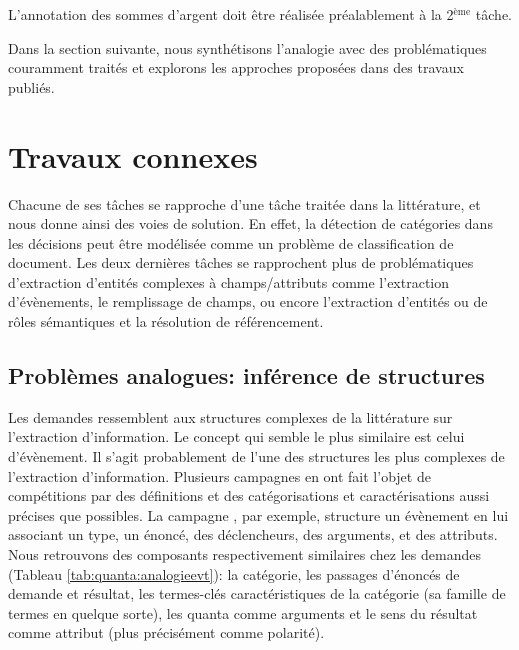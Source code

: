 L'annotation des sommes d'argent doit être réalisée préalablement à la 2$^\text{ème}$ tâche.

 Dans la section suivante, nous synthétisons l'analogie avec des problématiques couramment traités et explorons les approches proposées dans des travaux publiés.

\section{Travaux connexes}
\label{sec:quanta:biblio}
Chacune de ses tâches se rapproche d'une tâche traitée dans la littérature, et nous donne ainsi des voies de solution. En effet, la détection de catégories dans les décisions peut être modélisée comme un problème de classification de document. Les deux dernières tâches se rapprochent plus de problématiques d'extraction d'entités complexes à champs/attributs comme l'extraction d'évènements, le remplissage de champs, ou encore l'extraction d'entités ou de rôles sémantiques et la résolution de référencement.

\subsection{Problèmes analogues: inférence de structures}%

Les demandes ressemblent aux structures complexes de la littérature sur l'extraction d'information. Le concept qui semble le plus similaire est celui d'évènement. Il s'agit probablement de l'une des structures les plus complexes de l'extraction d'information. Plusieurs campagnes en ont fait l'objet de compétitions par des définitions et des catégorisations et caractérisations aussi précises que possibles. La campagne \citep{ace2005event}, par exemple, structure un évènement en lui associant un type, un énoncé, des déclencheurs, des arguments, et des attributs. Nous retrouvons des composants respectivement similaires chez les demandes (Tableau \ref{tab:quanta:analogieevt}): la catégorie, les passages d'énoncés de demande et résultat, les termes-clés caractéristiques de la catégorie (sa famille de termes en quelque sorte), les quanta comme arguments et le sens du résultat comme attribut (plus précisément comme polarité).


